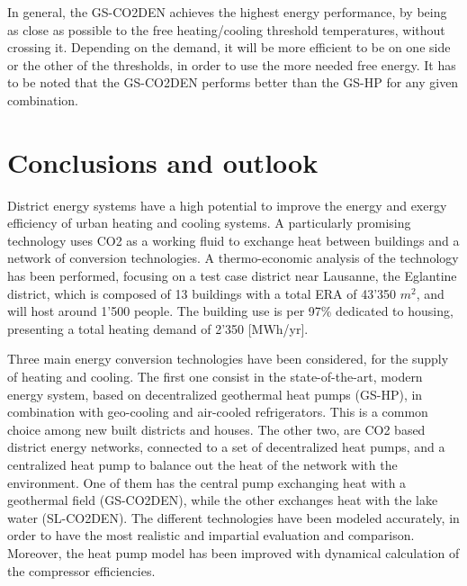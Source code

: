 \documentclass{article}
\begin{document}
In general, the GS-CO2DEN achieves the highest energy performance, by being as close as possible to the free heating/cooling threshold temperatures, without crossing it. Depending on the demand, it will be more efficient to be on one side or the other of the thresholds, in order to use the more needed free energy. It has to be noted that the GS-CO2DEN performs better than the GS-HP for any given combination. 

\newpage
\section{Conclusions and outlook}
District energy systems have a high potential to improve the energy and exergy efficiency of urban heating and cooling systems. A particularly promising technology uses CO2 as a working fluid to exchange heat between buildings and a network of conversion technologies. A thermo-economic analysis of the technology has been performed, focusing on a test case district near Lausanne, the Eglantine district, which is composed of 13 buildings with a total ERA of  43'350 $m^2$, and will host around 1'500 people. The building use is per 97\% dedicated to housing, presenting a total heating demand of 2'350 [MWh/yr].

Three main energy conversion technologies have been considered, for the supply of heating and cooling. The first one consist in the state-of-the-art, modern energy system, based on decentralized geothermal heat pumps (GS-HP), in combination with geo-cooling and air-cooled refrigerators. This is a common choice among new built districts and houses. The other two, are CO2 based district energy networks, connected to a set of decentralized heat pumps, and a centralized heat pump to balance out the heat of the network with the environment. One of them has the central pump exchanging heat with a geothermal field (GS-CO2DEN), while the other exchanges heat with the lake water (SL-CO2DEN). The different technologies have been modeled accurately, in order to have the most realistic and impartial evaluation and comparison. Moreover, the heat pump model has been improved with dynamical calculation of the compressor efficiencies.\\
\end{document}
